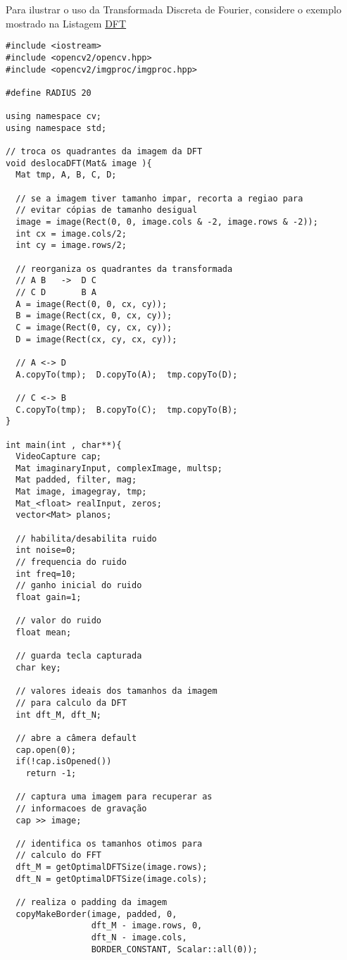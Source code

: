 \documentclass[11pt]{amsbook}
\begin{document}
Para ilustrar o uso da Transformada Discreta de Fourier, considere o
exemplo mostrado na Listagem \hyperlink{exa-dft}{DFT}


\begin{verbatim}
#include <iostream>
#include <opencv2/opencv.hpp>
#include <opencv2/imgproc/imgproc.hpp>

#define RADIUS 20

using namespace cv;
using namespace std;

// troca os quadrantes da imagem da DFT
void deslocaDFT(Mat& image ){
  Mat tmp, A, B, C, D;

  // se a imagem tiver tamanho impar, recorta a regiao para
  // evitar cópias de tamanho desigual
  image = image(Rect(0, 0, image.cols & -2, image.rows & -2));
  int cx = image.cols/2;
  int cy = image.rows/2;

  // reorganiza os quadrantes da transformada
  // A B   ->  D C
  // C D       B A
  A = image(Rect(0, 0, cx, cy));
  B = image(Rect(cx, 0, cx, cy));
  C = image(Rect(0, cy, cx, cy));
  D = image(Rect(cx, cy, cx, cy));

  // A <-> D
  A.copyTo(tmp);  D.copyTo(A);  tmp.copyTo(D);

  // C <-> B
  C.copyTo(tmp);  B.copyTo(C);  tmp.copyTo(B);
}

int main(int , char**){
  VideoCapture cap;
  Mat imaginaryInput, complexImage, multsp;
  Mat padded, filter, mag;
  Mat image, imagegray, tmp;
  Mat_<float> realInput, zeros;
  vector<Mat> planos;

  // habilita/desabilita ruido
  int noise=0;
  // frequencia do ruido
  int freq=10;
  // ganho inicial do ruido
  float gain=1;

  // valor do ruido
  float mean;

  // guarda tecla capturada
  char key;

  // valores ideais dos tamanhos da imagem
  // para calculo da DFT
  int dft_M, dft_N;

  // abre a câmera default
  cap.open(0);
  if(!cap.isOpened())
    return -1;

  // captura uma imagem para recuperar as
  // informacoes de gravação
  cap >> image;

  // identifica os tamanhos otimos para
  // calculo do FFT
  dft_M = getOptimalDFTSize(image.rows);
  dft_N = getOptimalDFTSize(image.cols);

  // realiza o padding da imagem
  copyMakeBorder(image, padded, 0,
                 dft_M - image.rows, 0,
                 dft_N - image.cols,
                 BORDER_CONSTANT, Scalar::all(0));


\end{verbatim}
\end{document}
